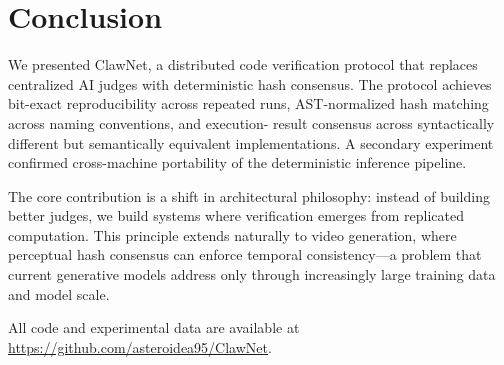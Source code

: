 \documentclass[11pt,a4paper]{article}
\begin{document}
\section{Conclusion}
\label{sec:conclusion}

We presented ClawNet, a distributed code verification protocol that
replaces centralized AI judges with deterministic hash consensus. The
protocol achieves bit-exact reproducibility across repeated runs,
AST-normalized hash matching across naming conventions, and execution-
result consensus across syntactically different but semantically
equivalent implementations. A secondary experiment confirmed
cross-machine portability of the deterministic inference pipeline.

The core contribution is a shift in architectural philosophy: instead of
building better judges, we build systems where verification emerges from
replicated computation. This principle extends naturally to video
generation, where perceptual hash consensus can enforce temporal
consistency---a problem that current generative models address
only through increasingly large training data and model scale.

All code and experimental data are available at
\url{https://github.com/asteroidea95/ClawNet}.
\end{document}
